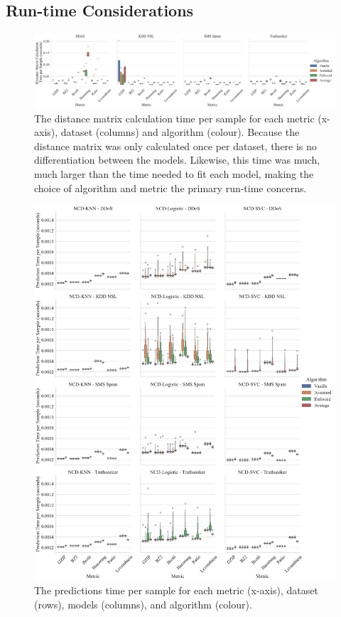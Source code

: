 \documentclass[conference]{IEEEtran}
\begin{document}
\subsection{Run-time Considerations}
\lipsum[1]
\begin{figure}[htb]
    \includegraphics[width=\textwidth]{images/train_time_vs_algorithm.pdf}
    \caption{The distance matrix calculation time per sample for each metric (x-axis), dataset (columns) and algorithm (colour). Because the distance matrix was only calculated once per dataset, there is no differentiation between the models. Likewise, this time was much, much larger than the time needed to fit each model, making the choice of algorithm and metric the primary run-time concerns.}
    \label{fig:train_time}
\end{figure}

\begin{figure}[htb]
    \includegraphics[width=\textwidth]{images/pred_time_vs_algorithm.pdf}
    \caption{The predictions time per sample for each metric (x-axis), dataset (rows), models (columns), and algorithm (colour).}
    \label{fig:pred_time}
\end{figure}
\end{document}
